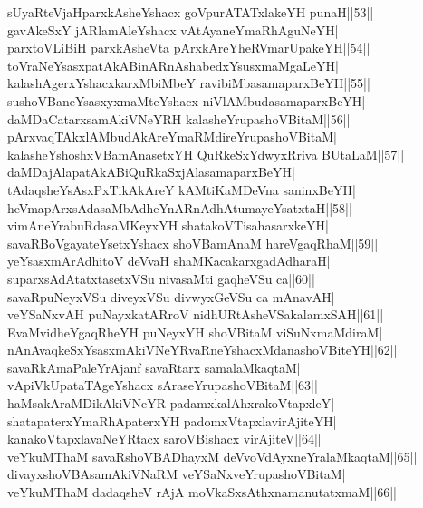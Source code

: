 \documentclass{article}
\begin{document}
sUyaRteVjaHparxkAsheYshacx goVpurATATxlakeYH punaH||53||\\
gavAkeSxY jARlamAleYshacx vAtAyaneYmaRhAguNeYH|\\
parxtoVLiBiH parxkAsheVta pArxkAreYheRVmarUpakeYH||54||\\
toVraNeYsasxpatAkABinARnAshabedxYsusxmaMgaLeYH|\\
kalashAgerxYshacxkarxMbiMbeY ravibiMbasamaparxBeYH||55||\\
sushoVBaneYsasxyxmaMteYshacx niVlAMbudasamaparxBeYH|\\
daMDaCatarxsamAkiVNeYRH kalasheYrupashoVBitaM||56||\\
pArxvaqTAkxlAMbudAkAreYmaRMdireYrupashoVBitaM|\\
kalasheYshoshxVBamAnasetxYH QuRkeSxYdwyxRriva BUtaLaM||57||\\
daMDajAlapatAkABiQuRkaSxjAlasamaparxBeYH|\\
tAdaqsheYsAsxPxTikAkAreY kAMtiKaMDeVna saninxBeYH|\\
heVmapArxsAdasaMbAdheYnARnAdhAtumayeYsatxtaH||58||\\
vimAneYrabuRdasaMKeyxYH shatakoVTisahasarxkeYH|\\
savaRBoVgayateYsetxYshacx shoVBamAnaM hareVgaqRhaM||59||\\
yeYsasxmArAdhitoV deVvaH shaMKacakarxgadAdharaH|\\
suparxsAdAtatxtasetxVSu nivasaMti gaqheVSu ca||60||\\
savaRpuNeyxVSu diveyxVSu divwyxGeVSu ca mAnavAH|\\
veYSaNxvAH puNayxkatARroV nidhURtAsheVSakalamxSAH||61||\\
EvaMvidheYgaqRheYH puNeyxYH shoVBitaM viSuNxmaMdiraM|\\
nAnAvaqkeSxYsasxmAkiVNeYRvaRneYshacxMdanashoVBiteYH||62||\\
savaRkAmaPaleYrAjanf savaRtarx samalaMkaqtaM|\\
vApiVkUpataTAgeYshacx sAraseYrupashoVBitaM||63||\\
haMsakAraMDikAkiVNeYR padamxkalAhxrakoVtapxleY|\\
shatapaterxYmaRhApaterxYH padomxVtapxlavirAjiteYH|\\
kanakoVtapxlavaNeYRtacx saroVBishacx virAjiteV||64||\\
veYkuMThaM savaRshoVBADhayxM deVvoVdAyxneYralaMkaqtaM||65||\\
divayxshoVBAsamAkiVNaRM veYSaNxveYrupashoVBitaM|\\
veYkuMThaM dadaqsheV rAjA moVkaSxsAthxnamanutatxmaM||66||\\
\end{document}
